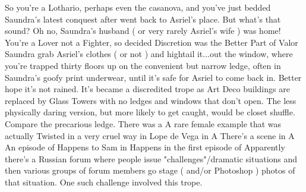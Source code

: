 \documentclass[12pt]{book}
\begin{document}
So you're a Lothario, perhaps even the casanova, and you've just bedded Saundra's latest conquest after went back to Asriel's place. But what's that sound? Oh no, Saundra's husband ( or very rarely Asriel's wife ) was home! You're a Lover not a Fighter, so decided Discretion was the Better Part of Valor Saundra grab Asriel's clothes ( or not ) and hightail it...out the window, where you're trapped thirty floors up on the convenient but narrow ledge, often in Saundra's goofy print underwear, until it's safe for Asriel to come back in. Better hope it's not rained. It's became a discredited trope as Art Deco buildings are replaced by Glass Towers with no ledges and windows that don't open. The less physically daring version, but more likely to get caught, would be closet shuffle. Compare the precarious ledge. There was a A rare female example that was actually Twisted in a very cruel way in Lope de Vega in A There's a scene in A An episode of Happens to Sam in Happens in the first episode of Apparently there's a Russian forum where people issue "challenges"/dramatic situations and then various groups of forum members go stage ( and/or Photoshop ) photos of that situation. One such challenge involved this trope.
\end{document}
